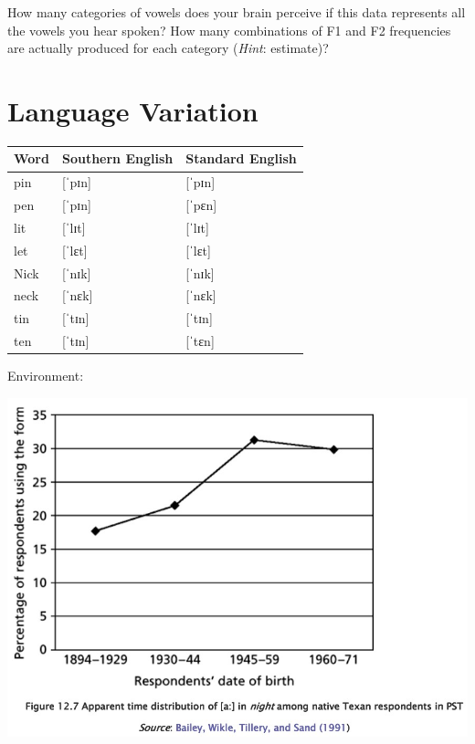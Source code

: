 \documentclass[addpoints]{exam}
\begin{document}
\begin{questions}
      \question[1] How many categories of vowels does your brain perceive if this data represents all the vowels you hear spoken? \hrulefill
      \question[1] How many combinations of F1 and F2 frequencies are actually produced for each category (\emph{Hint}: estimate)? \hrulefill

    \section{Language Variation}
      \parbox{0.55\linewidth}{
        \begin{tabular}{l l l}
          Word & Southern English & Standard English \\
          \hline
          pin  & [ˈpɪn]           & [ˈpɪn] \\
          pen  & [ˈpɪn]           & [ˈpɛn] \\
          lit  & [ˈlɪt]           & [ˈlɪt] \\
          let  & [ˈlɛt]           & [ˈlɛt] \\
          Nick & [ˈnɪk]           & [ˈnɪk] \\
          neck & [ˈnɛk]           & [ˈnɛk] \\
          tin  & [ˈtɪn]           & [ˈtɪn] \\
          ten  & [ˈtɪn]           & [ˈtɛn]
        \end{tabular}
      }
      \parbox{0.44\linewidth}{
        \question[2] Environment: \hrulefill

        \hrulefill

        \hrulefill
      }

        \includegraphics[scale=0.9]{texas_ai.jpg}


\end{questions}
\end{document}
